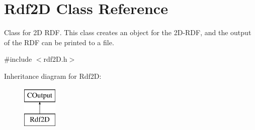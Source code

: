 \hypertarget{classRdf2D}{}\section{Rdf2D Class Reference}
\label{classRdf2D}


Class for 2D R\+DF. This class creates an object for the 2\+D-\/\+R\+DF, and the output of the R\+DF can be printed to a file.  




{\ttfamily \#include $<$rdf2\+D.\+h$>$}

Inheritance diagram for Rdf2D\+:\begin{figure}[H]
\begin{center}
\leavevmode
\includegraphics[height=2.000000cm]{classRdf2D}
\end{center}
\end{figure}
